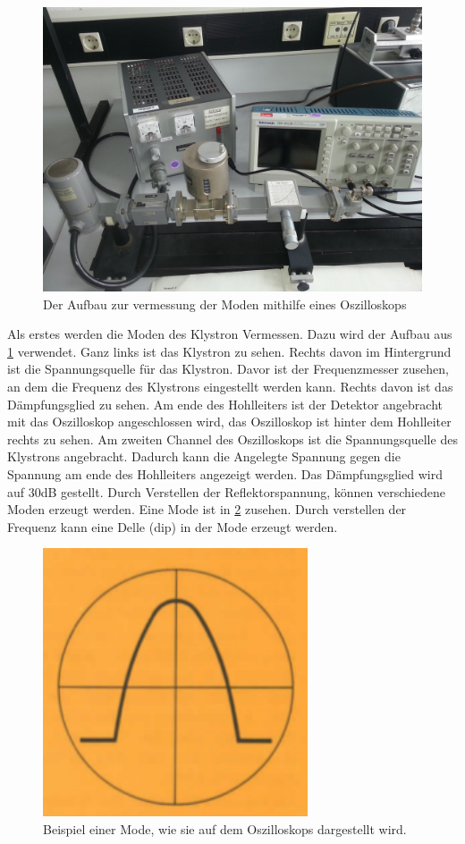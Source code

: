  \begin{figure}[h!]
 	\centering
 	\includegraphics[scale = 0.1]{../Grafiken/Aufbau_1.jpg}
 	\caption{Der Aufbau zur vermessung der Moden mithilfe eines Oszilloskops\label{fig:Moden}}
 \end{figure}
 Als erstes werden die Moden des Klystron Vermessen. Dazu wird der Aufbau aus \cref{fig:Moden} verwendet. Ganz links ist das Klystron zu sehen. Rechts davon im Hintergrund ist die Spannungsquelle für das Klystron. Davor ist der Frequenzmesser zusehen, an dem die Frequenz des Klystrons eingestellt werden kann. Rechts davon ist das Dämpfungsglied zu sehen. Am ende des Hohlleiters ist der Detektor angebracht mit das Oszilloskop angeschlossen wird, das Oszilloskop ist hinter dem Hohlleiter rechts zu sehen. Am zweiten Channel des Oszilloskops ist die Spannungsquelle des Klystrons angebracht. Dadurch kann die Angelegte Spannung gegen die Spannung am ende des Hohlleiters angezeigt werden. Das Dämpfungsglied wird auf 30dB gestellt. Durch Verstellen der Reflektorspannung, können verschiedene Moden erzeugt werden. Eine Mode ist in \cref{fig:BeispielMode} zusehen. Durch verstellen der Frequenz kann eine Delle (dip) in der Mode erzeugt werden.
 \begin{figure}[h!]
  	\centering
  	\includegraphics[scale = 1]{../Grafiken/Moden.pdf}
  	\caption{Beispiel einer Mode, wie sie auf dem Oszilloskops dargestellt wird.\cite{V53}\label{fig:BeispielMode}}
  \end{figure}
